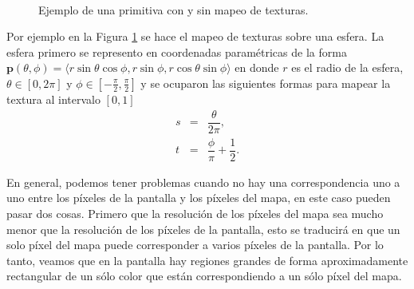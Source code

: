 \begin{figure}[htp]
\begin{center}
     \\
  \end{center}
  \caption[Mapeo de texturas]{Ejemplo de una primitiva con y sin mapeo de texturas.}
  \label{fig:textureMapping}
\end{figure}

Por ejemplo en la Figura \ref{fig:textureMapping} se hace el mapeo de texturas sobre una esfera. La esfera primero se represento en coordenadas paramétricas de la forma $\textbf{p}(\theta, \phi) = \langle r \sin \theta \cos \phi , r \sin \phi, r \cos \theta \sin \phi \rangle$ en donde $r$ es el radio de la esfera, $\theta \in [0, 2 \pi]$ y $\phi \in [-\frac{\pi}{2}, \frac{\pi}{2}]$ y se ocuparon las siguientes formas para mapear la textura al intervalo $[0, 1]$
\begin{eqnarray}
\nonumber
s & = & \dfrac{\theta}{2 \pi}, \\
t & = & \dfrac{\phi}{\pi} + \dfrac{1}{2}.
\end{eqnarray}

En general, podemos tener problemas cuando no hay una correspondencia uno a uno entre los píxeles de la pantalla y los píxeles del mapa, en este caso pueden pasar dos cosas. Primero que la resolución de los píxeles del mapa sea mucho menor que la resolución de los píxeles de la pantalla, esto se traducirá en que un solo píxel del mapa puede corresponder a varios píxeles de la pantalla. Por lo tanto, veamos que en la pantalla hay regiones grandes de forma aproximadamente rectangular de un sólo color que están correspondiendo a un sólo píxel del mapa.


